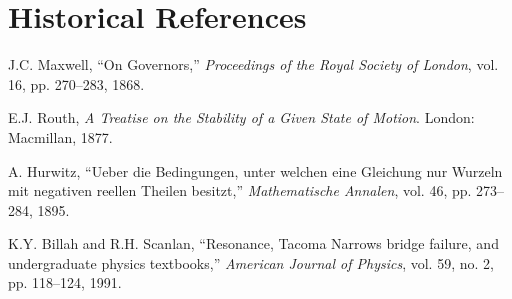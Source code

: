 
\section*{Historical References}

\begin{enumerate}[label={[\arabic*]}]
\item J.C. Maxwell, ``On Governors,'' \textit{Proceedings of the Royal Society of London}, vol. 16, pp. 270--283, 1868.

\item E.J. Routh, \textit{A Treatise on the Stability of a Given State of Motion}. London: Macmillan, 1877.

\item A. Hurwitz, ``Ueber die Bedingungen, unter welchen eine Gleichung nur Wurzeln mit negativen reellen Theilen besitzt,'' \textit{Mathematische Annalen}, vol. 46, pp. 273--284, 1895.

\item K.Y. Billah and R.H. Scanlan, ``Resonance, Tacoma Narrows bridge failure, and undergraduate physics textbooks,'' \textit{American Journal of Physics}, vol. 59, no. 2, pp. 118--124, 1991.
\end{enumerate}

